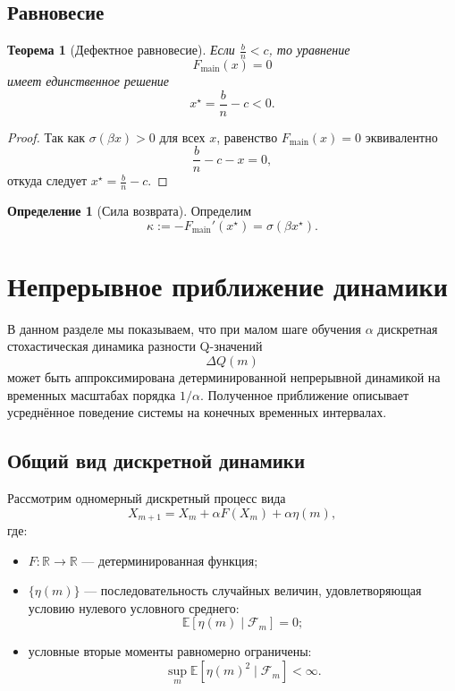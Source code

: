 \documentclass[12pt,a4paper]{article}
\newtheorem{theorem}{Теорема}
\theoremstyle{definition}
\newtheorem{definition}{Определение}
\begin{document}
\subsection{Равновесие}

\begin{theorem}[Дефектное равновесие]
\label{thm:defection_equilibrium}
Если $\frac{b}{n}<c$, то уравнение
\[
F_{\mathrm{main}}(x)=0
\]
имеет единственное решение
\[
x^\star=\frac{b}{n}-c<0.
\]
\end{theorem}

\begin{proof}
Так как $\sigma(\beta x)>0$ для всех $x$, равенство
$F_{\mathrm{main}}(x)=0$ эквивалентно
\[
\frac{b}{n}-c-x=0,
\]
откуда следует $x^\star=\frac{b}{n}-c$.
\end{proof}

\begin{definition}[Сила возврата]
Определим
\[
\kappa := -F_{\mathrm{main}}'(x^\star)
=
\sigma(\beta x^\star).
\]
\end{definition}



\section{Непрерывное приближение динамики}

В данном разделе мы показываем, что при малом шаге обучения $\alpha$
дискретная стохастическая динамика разности Q-значений
\[
\Delta Q(m)
\]
может быть аппроксимирована детерминированной непрерывной динамикой
на временных масштабах порядка $1/\alpha$.
Полученное приближение описывает усреднённое поведение системы
на конечных временных интервалах.

\subsection{Общий вид дискретной динамики}

Рассмотрим одномерный дискретный процесс вида
\begin{equation}
\label{eq:sa_general_simple}
X_{m+1}
=
X_m
+
\alpha F(X_m)
+
\alpha \eta(m),
\end{equation}
где:
\begin{itemize}
\item $F:\mathbb{R}\to\mathbb{R}$ — детерминированная функция;
\item $\{\eta(m)\}$ — последовательность случайных величин,
удовлетворяющая условию нулевого условного среднего:
\[
\mathbb E[\eta(m)\mid \mathcal F_m]=0;
\]
\item условные вторые моменты равномерно ограничены:
\[
\sup_m \mathbb E[\eta(m)^2\mid \mathcal F_m] < \infty.
\]
\end{itemize}
\end{document}
